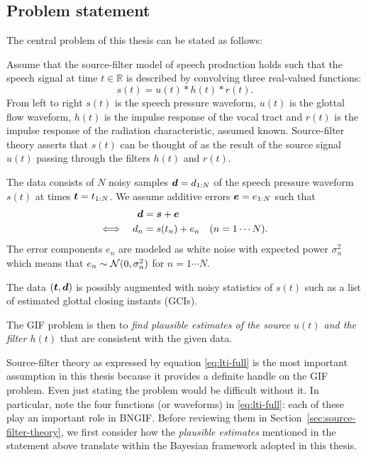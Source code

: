\begin{chaptersections}

\section{Problem statement\label{sec:problem-statement}}

The central problem of this thesis can be stated as follows:

\begin{mdframed}[frametitle={Glottal inverse filtering (GIF)}]
Assume that the source-filter model of speech production \citep{Fant1960} holds such that the speech signal at time $t \in \mathbb{R}$ is described by convolving three real-valued functions: 
\begin{equation}
    s(t) = u(t) * h(t) * r(t). \label{eq:lti-full}
\end{equation}
From left to right $s(t)$ is the speech pressure waveform, $u(t)$ is the glottal flow waveform, $h(t)$ is the impulse response of the vocal tract and $r(t)$ is the impulse response of the radiation characteristic, assumed known.
Source-filter theory asserts that $s(t)$ can be thought of as the result of the source signal $u(t)$ passing through the filters $h(t)$ and $r(t)$.

The data consists of $N$ noisy samples ${\bm d} = d_{1:N}$ of the speech pressure waveform $s(t)$ at times ${\bm t} = t_{1:N}$.
We assume additive errors ${\bm e} = e_{1:N}$ such that
\begin{align} 
{\bm d} &= {\bm s} + {\bm e} \\
\Longleftrightarrow \quad d_n &= s(t_n) + e_n \quad (n = 1 \cdots N).
\end{align}
The error components $e_n$ are modeled as white noise with expected power $\sigma_n^2$ which means that $e_n  \sim \operatorname{\mathcal{N}}(0, \sigma_n^2)$ for $n = 1 \cdots N$.

The data $({\bm t},{\bm d})$ is possibly augmented with noisy statistics of $s(t)$ such as a list of estimated glottal closing instants (GCIs).

The GIF problem is then to \emph{find plausible estimates of the source $u(t)$ and the filter $h(t)$} that are consistent with the given data.
\end{mdframed}

Source-filter theory as expressed by equation \eqref{eq:lti-full} is the most important assumption in this thesis because it provides a definite handle on the GIF problem.
Even just stating the problem would be difficult without it.
In particular, note the four functions (or waveforms) in \eqref{eq:lti-full}:
each of these play an important role in BNGIF.
Before reviewing them in Section~\ref{sec:source-filter-theory}, we first consider how the \emph{plausible estimates} mentioned in the statement above translate within the Bayesian framework adopted in this thesis.


\end{chaptersections}
